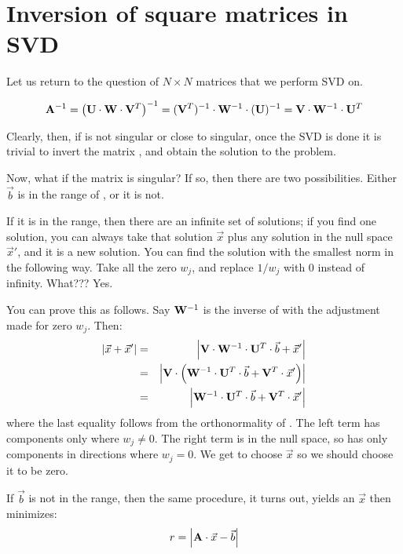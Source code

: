 \section{Inversion of square matrices in SVD}

Let us return to the question of $N\times N$ matrices that we perform
SVD on.


\begin{answer}
\begin{equation}
{\bf A}^{-1}
= \left( {\bf U} \cdot {\bf W} \cdot {\bf V}^T\right)^{-1} 
= ({\bf V}^{T})^{-1} \cdot {\bf W}^{-1} \cdot ({\bf U})^{-1} 
= {\bf V} \cdot {\bf W}^{-1} \cdot {\bf U}^{T} 
\end{equation}
\end{answer}

Clearly, then, if  is not singular or close to singular, once
the SVD is done it is trivial to invert the matrix , and obtain
the solution to the problem.

Now, what if the matrix  is singular? If so, then there are two
possibilities. Either $\vec{b}$ is in the range of , or it is
not.

If it is in the range, then there are an infinite set of solutions; if
you find one solution, you can always take that solution $\vec{x}$
plus any solution in the null space $\vec{x}'$, and it is a new
solution.  You can find the solution with the smallest norm in the
following way. Take all the zero $w_j$, and replace $1/w_j$ with 0
instead of infinity. What??? Yes.

You can prove this as follows. Say ${\bf W}^{-1}$ is the inverse
of  with the adjustment made for zero $w_j$. Then:
\begin{eqnarray}
|\vec{x} + \vec{x}'|
&=& \left| {\bf V}\cdot{\bf W}^{-1} \cdot {\bf U}^T\cdot \vec{b}
+ \vec{x}'\right| \cr
&=& \left| {\bf V}\cdot \left({\bf W}^{-1} \cdot {\bf U}^T\cdot \vec{b}
+ {\bf V}^T \cdot \vec{x}' \right)\right| \cr
&=& \left| {\bf W}^{-1} \cdot {\bf U}^T\cdot \vec{b}
+ {\bf V}^T\cdot \vec{x}'\right| 
\end{eqnarray}
where the last equality follows from the orthonormality of .
The left term has components only where $w_j\ne 0$. The right term is
in the null space, so has only components in directions where $w_j=0$.
We get to choose $\vec{x}$ so we should choose it to be zero.

If $\vec{b}$ is not in the range, then the same procedure, it turns
out, yields an $\vec{x}$ then minimizes:
\begin{equation}
r = \left|{\bf A}\cdot\vec{x} - \vec{b}\right|
\end{equation}

